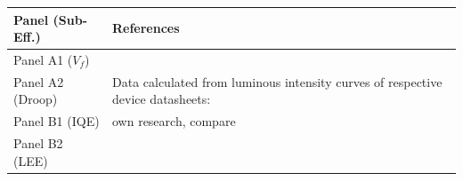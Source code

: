 \documentclass[10pt]{article}
\begin{document}
\begin{table}[h!]
    \begin{tabularx}{\textwidth}{|l|X|}
    \hline
    \textbf{Panel (Sub-Eff.)} & \textbf{References} \\
    \hline
    Panel A1 ($V_f$) & \cite{nichia2001data}\cite{lumi2002data}\cite{gen2005data}\cite{candlepwr2005data}\cite{lumi2006data}\cite{lumi2007data}\cite{nichia2008data}\cite{lumi2008data}\cite{osram2008data}\cite{jeong2011high}\cite{osram2012data}\cite{osram2013data}\cite{osram2014data} \newline \cite{lumi2016data_1}\cite{lumi2016data_2}\cite{epistar2017data}\cite{osram2017data_1}\cite{osram2017data_2}\cite{samsung2017data}\cite{samsung2018data}\cite{osram2018data}\cite{epistar2018data}\cite{lumi2019data} \\
    \hline
    Panel A2 (Droop) & Data calculated from luminous intensity curves of respective device datasheets: \cite{datasheet_osram_topled}\cite{osram2008data}\cite{osram2008gdplus}\cite{osram2018csp}\cite{datasheet_lumileds_lux1}\cite{lumi2008data}\cite{lumi2016data_1}\cite{lumi2016data_2}\cite{samsung2018data} \\
    \hline
    Panel B1 (IQE) & own research, compare \cite{zenodo_weinold_led_history} \newline
\cite{doe_ssl_multiyear_2006}\cite{doe_ssl_multiyear_2007}\cite{doe_ssl_multiyear_2008}\cite{doe_ssl_multiyear_2009}\cite{doe_ssl_multiyear_2010}\cite{doe_ssl_multiyear_2011}\cite{doe_ssl_multiyear_2012}\cite{doe_ssl_multiyear_2013}\cite{doe_ssl_multiyear_2014}\cite{doe_ssl_rnd_2015}\cite{doe_ssl_rnd_2016} \\
    \hline
    Panel B2 (LEE) & \cite{lee2005analysis}\cite{krames2007status}\cite{Jang2004}\cite{Horng2013}\cite{Liao2010}\cite{HungWenHuang2005}\cite{Leem2007}\cite{Huang2008}\cite{Wang2009}\cite{Huh2003}\cite{Horng2008}\cite{Gao2008}\cite{Chang2003}\cite{Zhou2012} \newline \cite{ChunJuTun2006}\cite{Hua2009}\cite{Matioli2010}
\cite{lee2005analysis}\cite{Zhu2015}\cite{Ding2015}\cite{Taki2019}\cite{Shchekin2006}\cite{Hu2016}\cite{Horng2010}\cite{Lin2016}\cite{Yue2018}\cite{Zhao2012}\cite{Zhu2015}\newline \cite{Ding2015}\cite{wierer2001high}\cite{Steigerwald2002}\cite{DaeSeobHan2006}\cite{Wang2006}\cite{Lee2007}\cite{Shen2007}\cite{Huang2006}\cite{Zhmakin2011} \\
    \hline
    \end{tabularx}
\end{table}

\newpage


\end{document}
